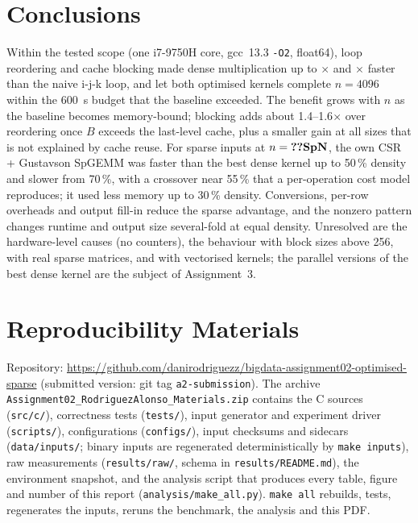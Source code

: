 \documentclass[conference,a4paper]{IEEEtran}
\begin{document}
\section{Conclusions}
\label{sec:conclusions}
Within the tested scope (one i7-9750H core, gcc~13.3 \texttt{-O2}, float64), loop reordering and cache
blocking made dense multiplication up to $\times$ and $\times$ faster than the naive
i-j-k loop, and let both optimised kernels complete $n=4096$ within the \SI{600}{s} budget that the baseline
exceeded. The benefit grows with $n$ as the baseline becomes memory-bound; blocking adds about 1.4--1.6$\times$
over reordering once $B$ exceeds the last-level cache, plus a smaller gain at all sizes that is not explained
by cache reuse. For sparse inputs at $n=\val{SpN}$, the own CSR + Gustavson SpGEMM was faster than the best
dense kernel up to 50\,\% density and slower from 70\,\%, with a crossover near 55\,\% that a per-operation cost
model reproduces; it used less memory up to 30\,\% density. Conversions, per-row overheads and output fill-in
reduce the sparse advantage, and the nonzero pattern changes runtime and output size several-fold at equal
density. Unresolved are the hardware-level causes (no counters), the behaviour with block sizes above 256,
with real sparse matrices, and with vectorised kernels; the parallel versions of the best dense kernel are
the subject of Assignment~3.

\section*{Reproducibility Materials}
Repository: \url{https://github.com/danirodriguezz/bigdata-assignment02-optimised-sparse}
(submitted version: git tag \texttt{a2-submission}). The archive \texttt{Assignment02\_RodriguezAlonso\_Materials.zip} contains
the C sources (\texttt{src/c/}), correctness tests (\texttt{tests/}), input generator and experiment driver
(\texttt{scripts/}), configurations (\texttt{configs/}), input checksums and sidecars (\texttt{data/inputs/};
binary inputs are regenerated deterministically by \texttt{make inputs}), raw measurements
(\texttt{results/raw/}, schema in \texttt{results/README.md}), the environment snapshot, and the analysis
script that produces every table, figure and number of this report (\texttt{analysis/make\_all.py}).
\texttt{make all} rebuilds, tests, regenerates the inputs, reruns the benchmark, the analysis and this PDF.
\end{document}
